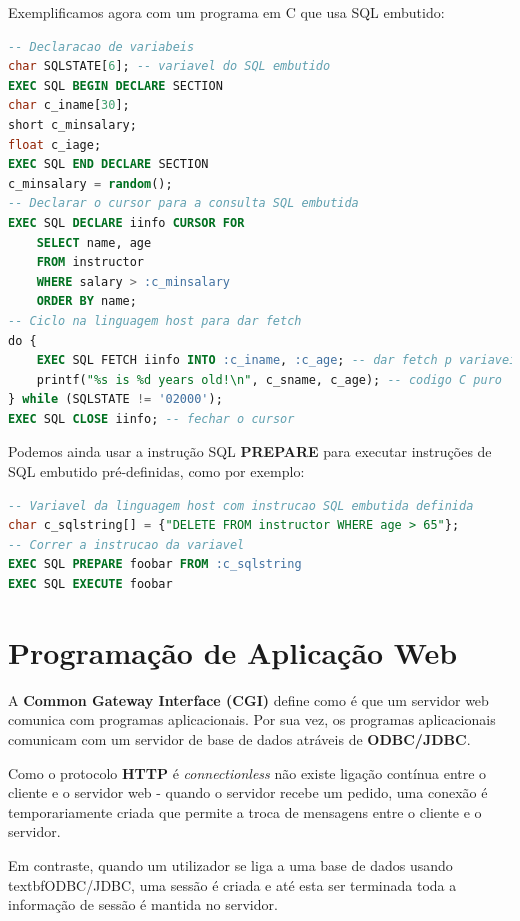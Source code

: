 \documentclass[oneside]{book}
\theoremstyle{definition}
\begin{document}
Exemplificamos agora com um programa em C que usa SQL embutido:
\begin{lstlisting}[language=SQL, morekeywords={char*, EXEC, SQL, CONNECT, IDENTIFIED, DECLARE, SECTION, CURSOR, FOR, short, FETCH, CLOSE}, framesep=8pt, xleftmargin=40pt, framexleftmargin=40pt, frame=tb, framerule=0pt]
-- Declaracao de variabeis
char SQLSTATE[6]; -- variavel do SQL embutido
EXEC SQL BEGIN DECLARE SECTION
char c_iname[30];
short c_minsalary;
float c_iage;
EXEC SQL END DECLARE SECTION
c_minsalary = random();
-- Declarar o cursor para a consulta SQL embutida
EXEC SQL DECLARE iinfo CURSOR FOR
    SELECT name, age
    FROM instructor
    WHERE salary > :c_minsalary
    ORDER BY name;
-- Ciclo na linguagem host para dar fetch
do {
    EXEC SQL FETCH iinfo INTO :c_iname, :c_age; -- dar fetch p variaveis locais
    printf("%s is %d years old!\n", c_sname, c_age); -- codigo C puro
} while (SQLSTATE != '02000');
EXEC SQL CLOSE iinfo; -- fechar o cursor
\end{lstlisting}

Podemos ainda usar a instrução SQL \textbf{PREPARE} para executar instruções de SQL embutido pré-definidas, como por exemplo:
\begin{lstlisting}[language=SQL, morekeywords={char*, EXEC, SQL, CONNECT, IDENTIFIED, DECLARE, SECTION, CURSOR, FOR, short, FETCH, CLOSE}, framesep=8pt, xleftmargin=40pt, framexleftmargin=40pt, frame=tb, framerule=0pt]
-- Variavel da linguagem host com instrucao SQL embutida definida
char c_sqlstring[] = {"DELETE FROM instructor WHERE age > 65"};
-- Correr a instrucao da variavel
EXEC SQL PREPARE foobar FROM :c_sqlstring
EXEC SQL EXECUTE foobar
\end{lstlisting}

\section{Programação de Aplicação Web}
A \textbf{Common Gateway Interface (CGI)} define como é que um servidor web comunica com programas aplicacionais. Por sua vez, os programas aplicacionais comunicam com um servidor de base de dados atráveis de \textbf{ODBC/JDBC}.

Como o protocolo \textbf{HTTP} é \textit{connectionless} não existe ligação contínua entre o cliente e o servidor web - quando o servidor recebe um pedido, uma conexão é temporariamente criada que permite a troca de mensagens entre o cliente e o servidor.

Em contraste, quando um utilizador se liga a uma base de dados usando textbf{ODBC/JDBC}, uma sessão é criada e até esta ser terminada toda a informação de sessão é mantida no servidor.
\end{document}
